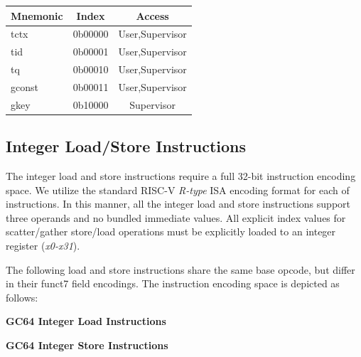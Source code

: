 \documentclass{article}
\begin{document}
\begin{center}
\begin{tabular}{| l | c | c | }
\hline
Mnemonic & Index & Access \\ \hline
\hline
tctx & 0b00000 & User,Supervisor \\
\hline
tid & 0b00001 & User,Supervisor \\
\hline
tq & 0b00010 & User,Supervisor \\
\hline
gconst & 0b00011 & User,Supervisor \\
\hline
gkey & 0b10000 & Supervisor\\
\hline
\end{tabular}
\end{center}


\subsection{Integer Load/Store Instructions}

The integer load and store instructions require a full 32-bit
instruction encoding space.  We utilize the standard RISC-V
\emph{R-type} ISA encoding format for each of instructions.  In
this manner, all the integer load and store instructions support
three operands and no bundled immediate values.  All explicit index
values for scatter/gather store/load operations must be explicitly
loaded to an integer register (\emph{x0-x31}).

The following load and store instructions share the same base
opcode, but differ in their funct7 field encodings.  The instruction
encoding space is depicted as follows:


\begin{center}
\textbf{GC64 Integer Load Instructions}
\makebox[0.03in][s]{}\makebox[0.03in][s]{}\makebox[0.03in][s]{}\makebox[0.03in][s]{}\makebox[0.03in][s]{}
\end{center}

\begin{center}
\textbf{GC64 Integer Store Instructions}
\makebox[0.03in][s]{}\makebox[0.03in][s]{}\makebox[0.03in][s]{}\makebox[0.03in][s]{}\makebox[0.03in][s]{}
\end{center}
\end{document}
